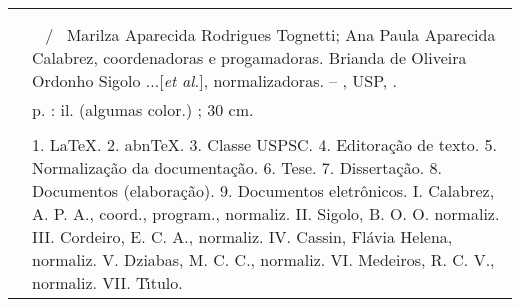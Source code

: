 %
\begin{fichacatalografica}
   \vspace*{\fill}					%
\begin{center}					%
  \imprimirnotabib \\
  \begin{table}[Htb]
	\scriptsize
	\centering	
	\begin{tabular}{|p{0.9cm} p{8.7cm}|}
		\hline
	      & \\
		  &	  \imprimirautorficha     \\
		
		 \imprimircutter & 
							\hspace{0.4cm}\imprimirtitulo~ / ~{Marilza Aparecida Rodrigues Tognetti; Ana Paula Aparecida Calabrez,  coordenadoras e progamadoras. Brianda de Oliveira Ordonho Sigolo ...[\textit{et al.}], normalizadoras}.
							 -- 	\imprimirlocal, USP, \imprimirdata.   \\
		
		  &			\hspace{0.4cm}\pageref{LastPage} p. : il. (algumas color.) ; 30 cm.\\ 
 		  & \\ 
		  & \hspace{0.4cm}1. LaTeX. 2. abnTeX. 3. Classe USPSC. 4. Editora\c{c}\~ao de texto. 5. Normaliza\c{c}\~ao da documenta\c{c}\~ao. 6. Tese. 7. Disserta\c{c}\~ao. 8. Documentos (elabora\c{c}\~ao). 9. Documentos eletr\^onicos. I. Calabrez, A. P. A., coord., program., normaliz. II. Sigolo, B. O. O. normaliz. III. Cordeiro, E. C. A., normaliz. IV. Cassin, Fl\'avia Helena, normaliz. V. Dziabas, M. C. C., normaliz. VI. Medeiros, R. C. V., normaliz.  VII. T\'{\i}tulo.  \\
	
		  \hline
	\end{tabular}
  \end{table}
\end{center}
\end{fichacatalografica}
